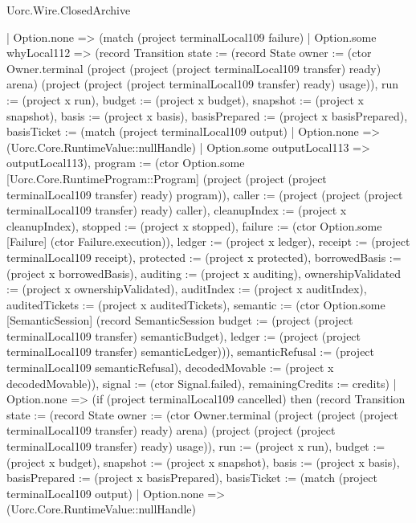 \begin{lexlean}{Uorc.Wire.ClosedArchive}
\begin{semanticmodule}
{        | Option.none => (match (project terminalLocal109 failure)
          | Option.some whyLocal112 => (record Transition {state := (record State {owner := (ctor Owner.terminal (project (project (project terminalLocal109 transfer) ready) arena) (project (project (project terminalLocal109 transfer) ready) usage)), run := (project x run), budget := (project x budget), snapshot := (project x snapshot), basis := (project x basis), basisPrepared := (project x basisPrepared), basisTicket := (match (project terminalLocal109 output)
            | Option.none => (Uorc.Core.RuntimeValue::nullHandle)
            | Option.some outputLocal113 => outputLocal113), program := (ctor Option.some [Uorc.Core.RuntimeProgram::Program] (project (project (project terminalLocal109 transfer) ready) program)), caller := (project (project (project terminalLocal109 transfer) ready) caller), cleanupIndex := (project x cleanupIndex), stopped := (project x stopped), failure := (ctor Option.some [Failure] (ctor Failure.execution)), ledger := (project x ledger), receipt := (project terminalLocal109 receipt), protected := (project x protected), borrowedBasis := (project x borrowedBasis), auditing := (project x auditing), ownershipValidated := (project x ownershipValidated), auditIndex := (project x auditIndex), auditedTickets := (project x auditedTickets), semantic := (ctor Option.some [SemanticSession] (record SemanticSession {budget := (project (project terminalLocal109 transfer) semanticBudget), ledger := (project (project terminalLocal109 transfer) semanticLedger)})), semanticRefusal := (project terminalLocal109 semanticRefusal), decodedMovable := (project x decodedMovable)}), signal := (ctor Signal.failed), remainingCredits := credits})
          | Option.none => (if (project terminalLocal109 cancelled) then (record Transition {state := (record State {owner := (ctor Owner.terminal (project (project (project terminalLocal109 transfer) ready) arena) (project (project (project terminalLocal109 transfer) ready) usage)), run := (project x run), budget := (project x budget), snapshot := (project x snapshot), basis := (project x basis), basisPrepared := (project x basisPrepared), basisTicket := (match (project terminalLocal109 output)
            | Option.none => (Uorc.Core.RuntimeValue::nullHandle)
}}}
\end{semanticmodule}
\end{lexlean}
